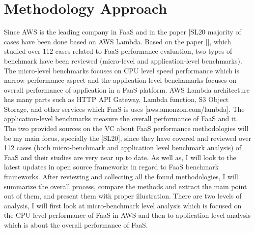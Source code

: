 %
\newpage
%
\section{Methodology Approach}
\label{sec:methodology-approach}
%
Since AWS is the leading company in FaaS and in the paper [SL20 majority of cases have been done based on AWS Lambda. Based on the paper [], which studied over 112 cases related to FaaS performance evaluation, two types of benchmark have been reviewed (micro-level and application-level benchmarks). The micro-level benchmarks focuses on CPU level speed performance which is narrow performance aspect and the application-level benchamarks focuses on overall performance of application in a FaaS platform. AWS Lambda architecture has many parts such as HTTP API Gateway, Lambda function, S3 Object Storage, and other services which FaaS is uses [aws.amonzon.com/lambda]. The application-level benchmarks measure the overall performance of FaaS and it. 
The two provided sources on the VC about FaaS performance methodologies will be my main focus, specially the [SL20], since they have covered and reviewed over 112 cases (both micro-benchmark and application level benchmark analysis) of FaaS and their studies are very near up to date. As well as, I will look to the latest updates in open source frameworks in regard to FaaS benchmark frameworks. After reviewing and collecting all the found methodologies, I will summarize the overall process, compare the methods and extract the main point out of them, and present them with proper illustration. There are two levels of analysis, I will first look at micro-benchmark level analysis which is focused on the CPU level performance of FaaS in AWS and then to application level analysis which is about the overall performance of FaaS.

%
\newpage
%
